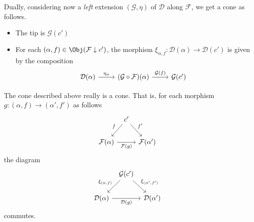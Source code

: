 \documentclass[notes.tex]{subfiles}
\begin{document}
Dually, considering now a \emph{left} extension $(\mathcal{G}, \eta)$ of $\mathcal{D}$ along $\mathcal{F}$, we get a cone as follows.
\begin{itemize}
  \item The tip is $\mathcal{G}(c')$

  \item For each $(\alpha, f) \in \Obj(\mathcal{F} \downarrow c')$, the morphism $\xi_{\alpha, f}\colon \mathcal{D}(\alpha) \to \mathcal{D}(c')$ is given by the composition
    \begin{equation*}
      \begin{tikzcd}
        \mathcal{D}(\alpha)
        \arrow[r, "\eta_{\alpha}"]
        & (\mathcal{G} \circ \mathcal{F})(\alpha)
        \arrow[r, "\mathcal{G}(f)"]
        & \mathcal{G}(c')
      \end{tikzcd}
    \end{equation*}
\end{itemize}

\begin{lemma}
  \label{lemma:right_extension_induces_cone}
  The cone described above really is a cone. That is, for each morphism $g\colon (\alpha, f) \to (\alpha', f')$ as follows
  \begin{equation*}
    \begin{tikzcd}[column sep=tiny]
      & c'
      \arrow[ld, swap, "f"]
      \arrow[rd, "f'"]
      \\
      \mathcal{F}(\alpha)
      \arrow[rr, swap, "\mathcal{F}(g)"]
      && \mathcal{F}(\alpha')
    \end{tikzcd}
  \end{equation*}
  the diagram
  \begin{equation*}
    \begin{tikzcd}[column sep=tiny]
      & \mathcal{G}(c')
      \arrow[dl, swap, "\xi_{(\alpha, f)}"]
      \arrow[dr, "\xi_{(\alpha', f')}"]
      \\
      \mathcal{D}(\alpha)
      \arrow[rr, swap, "\mathcal{D}(g)"]
      && \mathcal{D}(\alpha')
    \end{tikzcd}
  \end{equation*}
  commutes.
\end{lemma}
\end{document}
